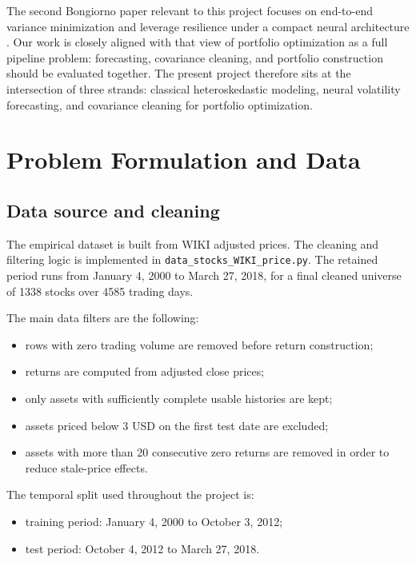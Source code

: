 \documentclass[11pt,a4paper]{article}
\begin{document}
The second Bongiorno paper relevant to this project focuses on end-to-end variance minimization and leverage resilience under a compact neural architecture \cite{bongiorno2025icaif}. Our work is closely aligned with that view of portfolio optimization as a full pipeline problem: forecasting, covariance cleaning, and portfolio construction should be evaluated together. The present project therefore sits at the intersection of three strands: classical heteroskedastic modeling, neural volatility forecasting, and covariance cleaning for portfolio optimization.

\section{Problem Formulation and Data}

\subsection{Data source and cleaning}

The empirical dataset is built from WIKI adjusted prices. The cleaning and filtering logic is implemented in \texttt{data\_stocks\_WIKI\_price.py}. The retained period runs from January 4, 2000 to March 27, 2018, for a final cleaned universe of 1338 stocks over 4585 trading days.

The main data filters are the following:
\begin{itemize}[leftmargin=1.5em]
\item rows with zero trading volume are removed before return construction;
\item returns are computed from adjusted close prices;
\item only assets with sufficiently complete usable histories are kept;
\item assets priced below 3 USD on the first test date are excluded;
\item assets with more than 20 consecutive zero returns are removed in order to reduce stale-price effects.
\end{itemize}

The temporal split used throughout the project is:
\begin{itemize}[leftmargin=1.5em]
\item training period: January 4, 2000 to October 3, 2012;
\item test period: October 4, 2012 to March 27, 2018.
\end{itemize}
\end{document}
